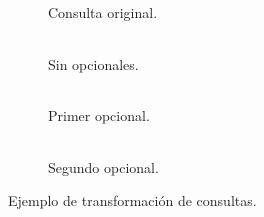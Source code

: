 \begin{figure}[htpb]
  \centering
  \begin{subfigure}[b]{\textwidth}
    \centering
    \begin{tabular}{c}
      
    \end{tabular}
    \caption{Consulta original.}
    \label{fig:exextr:or}
  \end{subfigure}
  \begin{subfigure}[b]{\textwidth}
    \centering
    \begin{tabular}{c}
      
    \end{tabular}
    \caption{Sin opcionales.}
    \label{fig:exextr:1}
  \end{subfigure}
  \begin{subfigure}[b]{.49\textwidth}
    \centering
    \begin{tabular}{c}
      
    \end{tabular}
    \caption{Primer opcional.}
    \label{fig:exextr:2}
  \end{subfigure}
  \begin{subfigure}[b]{.5\textwidth}
    \centering
    \begin{tabular}{c}
      
    \end{tabular}
    \caption{Segundo opcional.}
    \label{fig:exextr:3}
  \end{subfigure}
  \caption{Ejemplo de transformación de consultas.}\label{fig:exextr}
\end{figure}

